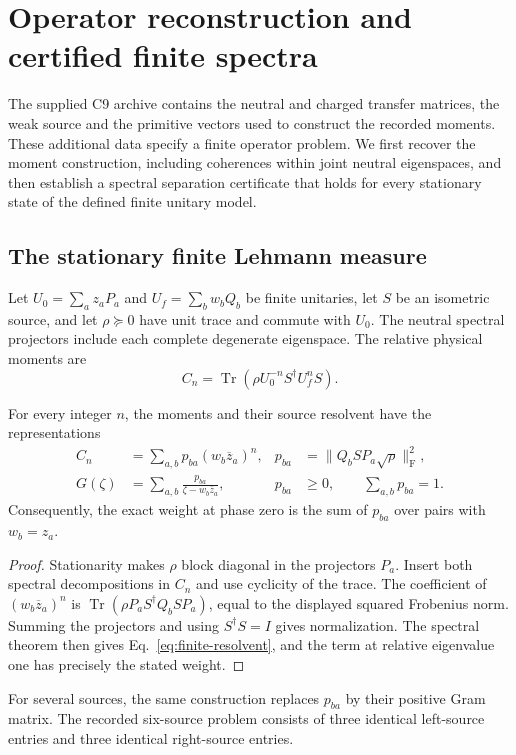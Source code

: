 \section{Operator reconstruction and certified finite spectra}
\label{sec:operator-spectrum}
The supplied C9 archive contains the neutral and charged transfer matrices, the weak source and the primitive vectors used to construct the recorded moments. These additional data specify a finite operator problem. We first recover the moment construction, including coherences within joint neutral eigenspaces, and then establish a spectral separation certificate that holds for every stationary state of the defined finite unitary model.

\subsection{The stationary finite Lehmann measure}
\label{sec:finite-lehmann}
Let $U_0=\sum_a z_aP_a$ and $U_f=\sum_b w_bQ_b$ be finite unitaries, let $S$ be an isometric source, and let $\rho\succeq0$ have unit trace and commute with $U_0$. The neutral spectral projectors include each complete degenerate eigenspace. The relative physical moments are
\[
C_n=\operatorname{Tr}\!\left(\rho U_0^{-n}S^\dagger U_f^nS\right).
\]
\begin{proposition}\label{prop:finite-lehmann}
For every integer $n$, the moments and their source resolvent have the representations
\begin{align}
C_n&=\sum_{a,b}p_{ba}(w_b\overline z_a)^n,
&p_{ba}&=\bigl\|Q_bSP_a\sqrt\rho\bigr\|_{\mathrm F}^2,\label{eq:finite-lehmann}\\
G(\zeta)&=\sum_{a,b}\frac{p_{ba}}{\zeta-w_b\overline z_a},
&p_{ba}&\geq0,\qquad\sum_{a,b}p_{ba}=1.\label{eq:finite-resolvent}
\end{align}
Consequently, the exact weight at phase zero is the sum of $p_{ba}$ over pairs with $w_b=z_a$.
\end{proposition}
\begin{proof}
Stationarity makes $\rho$ block diagonal in the projectors $P_a$. Insert both spectral decompositions in $C_n$ and use cyclicity of the trace. The coefficient of $(w_b\overline z_a)^n$ is
$\operatorname{Tr}(\rho P_aS^\dagger Q_bSP_a)$, equal to the displayed squared Frobenius norm. Summing the projectors and using $S^\dagger S=I$ gives normalization. The spectral theorem then gives Eq.~\eqref{eq:finite-resolvent}, and the term at relative eigenvalue one has precisely the stated weight.
\end{proof}
For several sources, the same construction replaces $p_{ba}$ by their positive Gram matrix. The recorded six-source problem consists of three identical left-source entries and three identical right-source entries.

